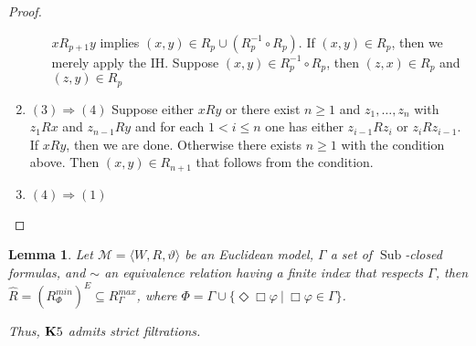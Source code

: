 \documentclass[a4paper]{article}
\theoremstyle{defin}
\theoremstyle{theorem}
\theoremstyle{prop}
\theoremstyle{lemma}
\newtheorem{lemma}{Lemma}
\theoremstyle{ex}
\theoremstyle{col}
\begin{document}
\begin{proof}
\begin{enumerate}
\begin{enumerate}
    $x R_{p + 1} y$ implies $(x, y) \in R_{p} \cup (R^{-1}_p \circ R_p)$. If $(x, y) \in R_{p}$, then we merely apply the IH.
    Suppose $(x, y) \in R^{-1}_p \circ R_p$, then $(z, x) \in R_p$ and $(z, y) \in R_p$
  \end{enumerate}
  \item $(3) \Rightarrow (4)$
  Suppose either $x R y$ or there exist $n \geq 1$ and $z_1, \dots, z_n$ with $z_1 R x$ and $z_{n - 1} R y$ and for each $1 < i \leq n$ one has either $z_{i - 1} R z_i$ or $z_i R z_{i - 1}$.
  If $x R y$, then we are done. Otherwise there exists $n \geq 1$ with the condition above. Then $(x, y) \in R_{n + 1}$ that follows from the condition.
  \item $(4) \Rightarrow (1)$
\end{enumerate}
\end{proof}

\begin{lemma}
  Let $\mathcal{M} = \langle W, R, \vartheta \rangle$ be an Euclidean model, $\Gamma$ a set of $\operatorname{Sub}$-closed formulas, and $\sim$ an equivalence relation having a finite index that respects $\Gamma$, then $\widehat{R} = (R^{min}_{\Phi})^{E} \subseteq R^{max}_{\Gamma}$, where $\Phi = \Gamma \cup \{ \Diamond \Box \varphi \: | \: \Box \varphi \in \Gamma \}$.

  Thus, ${\bf K}5$ admits strict filtrations.
\end{lemma}
\end{document}
